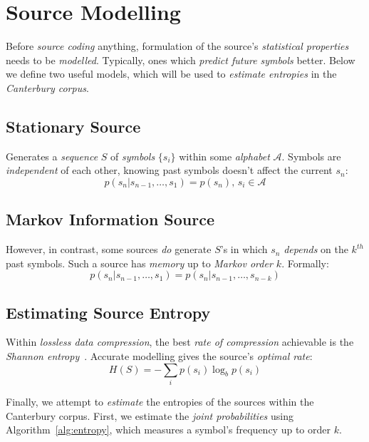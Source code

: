 \documentclass[a4paper, twocolumn]{article}
\begin{document}
    \section{Source Modelling} \label{sec:source_modelling}

        Before \emph{source coding} anything, formulation of the source's \emph{statistical properties} needs to be \emph{modelled}. Typically, ones which \emph{predict future symbols} better. Below we define two useful models, which will be used to \emph{estimate entropies} in the \emph{Canterbury corpus}.

        \subsection{Stationary Source} \label{sec:stationary_source}

        Generates a \emph{sequence} \(S\) of \emph{symbols} \(\{s_i\}\) within some \emph{alphabet} \(\mathcal{A}\). Symbols are \emph{independent} of each other, knowing past symbols doesn't affect the current \(s_n\): \[p(s_n | s_{n-1}, \dots, s_{1}) = p(s_n),\, s_i \in \mathcal{A}\]

        \subsection{Markov Information Source} \label{sec:markov_information_source}

        However, in contrast, some sources \emph{do} generate \(S\)'s in which \(s_n\) \emph{depends} on the \(k^{th}\) past symbols. Such a source has \emph{memory} up to \emph{Markov order \(k\)}. Formally: \[p(s_n | s_{n-1}, \dots, s_{1}) = p(s_n | s_{n-1}, \dots, s_{n-k})\]

        \subsection{Estimating Source Entropy} \label{sec:estimating_source_entropy}

        Within \emph{lossless data compression}, the best \emph{rate of compression} achievable is the \emph{Shannon entropy}~\cite{sayood2012introduction}. Accurate modelling gives the source's \emph{optimal rate}:
        \begin{equation} \label{eq:entropy}
            H(S) = -\sum_i p(s_i) \log_b p(s_i)
        \end{equation}

        Finally, we attempt to \emph{estimate} the entropies of the sources within the Canterbury corpus. First, we estimate the \emph{joint probabilities} using Algorithm~\ref{alg:entropy}, which measures a symbol's frequency up to order \(k\).
\end{document}
